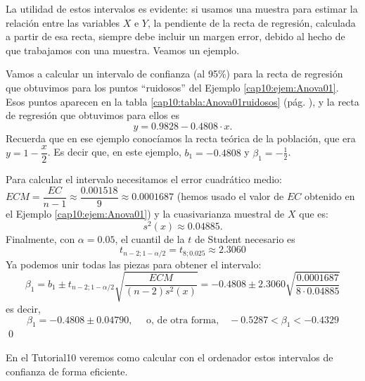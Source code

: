     \begin{center}
    \end{center}
La utilidad de estos intervalos es evidente: si usamos una muestra para estimar la relación entre las variables $X$ e $Y$, la pendiente de la recta de regresión, calculada a partir de esa recta, siempre debe incluir un margen error, debido al hecho de que trabajamos con una muestra. Veamos un ejemplo.

\begin{ejemplo}\label{cap10:ejem:IntConfianzaPendienteRecta}
Vamos a calcular un intervalo de confianza (al 95\%) para la recta de regresión que obtuvimos
para los puntos ``ruidosos'' del Ejemplo \ref{cap10:ejem:Anova01}. Esos puntos aparecen en la tabla \ref{cap10:tabla:Anova01ruidosos} (pág. \pageref{cap10:tabla:Anova01ruidosos}), y la recta de regresión que obtuvimos para ellos es
\[y=0.9828-0.4808\cdot x.\]
Recuerda que en ese ejemplo conocíamos la recta teórica de la población, que era
$y=1-\dfrac{x}{2}$. Es decir que, en este ejemplo, $b_1=-0.4808$ y $\beta_1=-\frac{1}{2}$.

Para calcular el intervalo necesitamos el error cuadrático medio:
$ECM=\dfrac{EC}{n-1}\approx\dfrac{0.001518}{9}\approx 0.0001687$
(hemos usado el valor de $EC$ obtenido en el Ejemplo \ref{cap10:ejem:Anova01}) y la cuasivarianza muestral de $X$ que es:
\[s^2(x)\approx 0.04885.\]
Finalmente, con $\alpha=0.05$, el cuantil de la $t$ de Student necesario es
\[t_{n-2;1-\alpha/2}= t_{8;0.025}\approx 2.3060\]
Ya podemos unir todas las piezas para obtener el intervalo:
\[
\beta_1=b_1\pm t_{n-2;1-\alpha/2}\sqrt{\dfrac{ECM}{(n-2)s^2(x)}}=
-0.4808\pm 2.3060\sqrt{\dfrac{0.0001687}{8\cdot 0.04885}}
\]
es decir,
\[
\beta_1=-0.4808\pm 0.04790,\quad \mbox{ o, de otra forma,}\quad
-0.5287  <\beta_1< -0.4329
\]
\qed
\end{ejemplo}
En el Tutorial10 veremos como calcular con el ordenador estos intervalos de confianza de forma eficiente.

